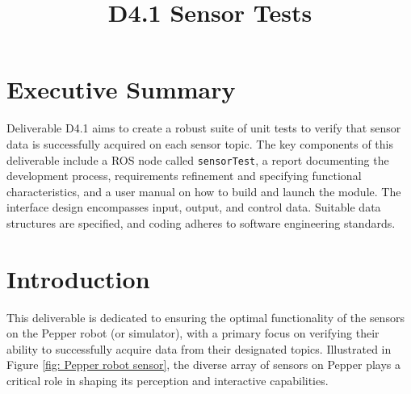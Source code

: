 \documentclass{CSSRforAfrica}
\begin{document}




\title{D4.1 Sensor Tests}   

\partner{}                                      




\maketitle
 

\section*{Executive Summary}
\label{executive_summary}
 
Deliverable D4.1 aims to create a robust suite of unit tests to verify that sensor data is successfully 
acquired on each sensor topic. The key components of this deliverable include a ROS node called 
\texttt{sensorTest}, a report documenting the development process, requirements refinement and 
specifying functional characteristics, and a user manual on how to build and launch the module. 
The interface design encompasses input, output, and control data. Suitable data structures are 
specified, and coding adheres to software engineering standards. 

\newpage
 
 
\pagebreak
\tableofcontents
\newpage


\section{Introduction}
This deliverable is dedicated to ensuring the optimal functionality of the sensors on the 
Pepper robot (or simulator), with a primary focus on verifying their ability to successfully 
acquire data from their designated topics. Illustrated in Figure \ref{fig: Pepper robot sensor},
the diverse array of sensors on Pepper plays a critical role in shaping its perception and 
interactive capabilities.
\end{document}
